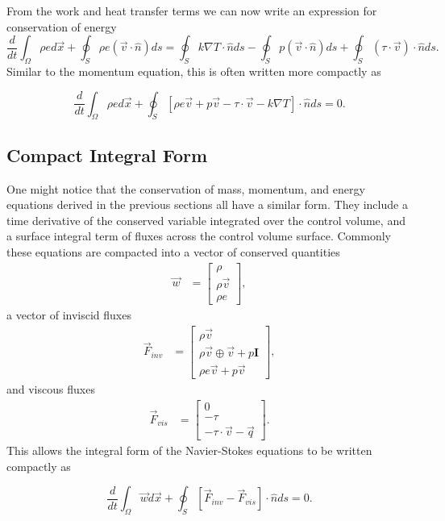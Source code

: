 From the work and heat transfer terms we can now write an expression for conservation of energy
\begin{equation}
\frac{d}{dt}\int_\Omega \rho e d\vec{x} + \oint_S \rho e (\vec{v} \cdot \hat{n}) ds = \oint_S k \nabla T \cdot \hat{n} ds - \oint_S p(\vec{v} \cdot \hat{n}) ds + \oint_S (\tau \cdot \vec{v})\cdot \hat{n} ds.
\end{equation}
Similar to the momentum equation, this is often written more compactly as
\begin{eqBox}
\begin{equation}
\frac{d}{dt}\int_\Omega \rho e d\vec{x} + \oint_S \left[ \rho e \vec{v} + p\vec{v} - \tau \cdot \vec{v} - k \nabla T \right] \cdot \hat{n} ds = 0.
\end{equation}
\end{eqBox}

\subsection{Compact Integral Form}
One might notice that the conservation of mass, momentum, and energy equations derived in the previous sections all have a similar form. They include a time derivative of the conserved variable integrated over the control volume, and a surface integral term of fluxes across the control volume surface. Commonly these equations are compacted into a vector of conserved quantities
\begin{align}
	\vec{w} &= \begin{bmatrix}
		\rho \\
	    \rho \vec{v} \\
	    \rho e
	\end{bmatrix},
\end{align}
a vector of inviscid fluxes
\begin{align}
	\vec{F}_{inv} &= \begin{bmatrix}
		\rho \vec{v} \\
	    \rho \vec{v} \oplus \vec{v} + p \mathbf{I} \\
	    \rho e \vec{v} + p\vec{v}
	\end{bmatrix},
\end{align}
and viscous fluxes
\begin{align}
	\vec{F}_{vis} &= \begin{bmatrix}
		0 \\
	    -\tau \\
	    -\tau \cdot \vec{v} - \vec{q}
	\end{bmatrix}.
\end{align}
This allows the integral form of the Navier-Stokes equations to be written compactly as
\begin{eqBox}
\begin{equation}
\label{eqn:compactintegral}
\frac{d}{dt}\int_\Omega \vec{w} d\vec{x} + \oint_S \left[\vec{F}_{inv} - \vec{F}_{vis}\right] \cdot \hat{n} ds = 0.
\end{equation}
\end{eqBox}


